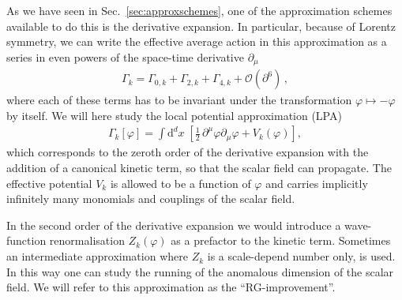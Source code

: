 \documentclass[11pt]{book}
\numberwithin{equation}{chapter}
\begin{document}
As we have seen in Sec.~\ref{sec:approxschemes}, one of the approximation
schemes available to do this is the derivative expansion.
In particular, because of Lorentz symmetry, we can write the effective
average action in this approximation as a series in even powers of the
space-time derivative $\partial_\mu$
\begin{align}
  \Gamma_k = \Gamma_{0,k}  + \Gamma_{2,k} +  \Gamma_{4,k} + \mathcal O(\partial^6) \,,
\end{align}
where each of these terms has to be invariant under the transformation
$\varphi \mapsto - \varphi$ by itself. We will here study the
local potential approximation (LPA)
\begin{align}
  \Gamma_k [\varphi] = \int \mathrm d^dx \;
  \left[
    \frac 12 \, \partial^\mu \varphi \partial_\mu \varphi
    + V_k (\varphi)
  \right] ,
\end{align}
which corresponds to the zeroth order of the derivative expansion
with the addition of a canonical kinetic term, so that the
scalar field can propagate. The effective potential $V_k$ is
allowed to be a function of $\varphi$ and carries implicitly
infinitely many monomials and couplings of the scalar field.

In the second order of the derivative
expansion we would introduce a wave-function renormalisation
$Z_k(\varphi)$ as a prefactor to the kinetic term. Sometimes
an intermediate approximation where $Z_k$ is a scale-depend
number only, is used. In this way one can study the running of
the anomalous dimension of the scalar field. We will refer to
this approximation as the ``RG-improvement''.
\end{document}
